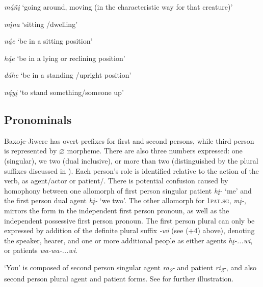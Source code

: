\documentclass[output=paper]{LSP/langsci}
\begin{document}
\hspace{2em} \textit{m\k{á}ñ\k{i}} `going around, moving (in the characteristic way for that creature)'
	
\hspace{2em} \textit{m\k{\'i}na}  `sitting /dwelling'

\hspace{2em} \textit{n\k{á}e} `be in a sitting position'

\hspace{2em} \textit{h\k{á}e}  `be in a lying or reclining position'

\hspace{2em} \textit{dáhe}  `be in a standing /upright position'

\hspace{2em} \textit{n\k{á}y\k{i}}   `to stand something/someone up'

\subsection{Pronominals}
Baxoje-Jiwere has overt prefixes for first and second persons, while third person is represented by $\varnothing$ morpheme.  There are also three numbers expressed:  one (singular), we two (dual inclusive), or more than two (distinguished by the plural suffixes discussed in ).  Each person's role is identified relative to the action of the verb, as agent/actor or patient/. There is potential confusion caused by homophony between one allomorph of first person singular patient \textit{h\k{i}-} `me' and the first person dual agent \textit{h\k{i}-} `we two'.  The other allomorph for 1\textsc{pat.sg}, \textit{m\k{i}-}, mirrors the form in the independent first person pronoun, as well as the independent possessive first person  pronoun.  The first person plural can only be expressed by addition of the definite plural suffix \textit{-wi} (see (+4) above), denoting the speaker, hearer, and one or more additional people as either agents \textit{h\k{i}-...wi}, or patients \textit{wa-wa-...wi}.  

`You' is composed of second person singular agent \textit{ra\textsubscript{2}-} and patient \textit{ri\textsubscript{2}-}, and also second person plural agent and patient forms.  See  for further illustration. 
\end{document}
